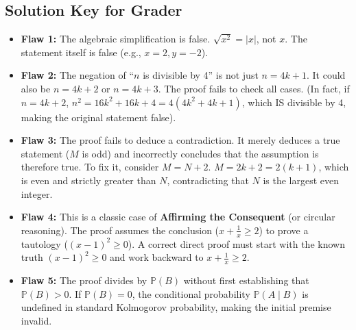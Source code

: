 \documentclass[11pt, a4paper]{article}
\theoremstyle{definition}
\theoremstyle{remark}
\newcommand{\Prob}{\mathbb{P}}
\begin{document}
\subsection*{Solution Key for Grader}
\begin{itemize}
    \item \textbf{Flaw 1:} The algebraic simplification is false. $\sqrt{x^2} = |x|$, not $x$. The statement itself is false (e.g., $x=2, y=-2$).
    \item \textbf{Flaw 2:} The negation of ``$n$ is divisible by 4'' is not just $n = 4k+1$. It could also be $n = 4k+2$ or $n = 4k+3$. The proof fails to check all cases. (In fact, if $n=4k+2$, $n^2 = 16k^2 + 16k + 4 = 4(4k^2+4k+1)$, which IS divisible by 4, making the original statement false).
    \item \textbf{Flaw 3:} The proof fails to deduce a contradiction. It merely deduces a true statement ($M$ is odd) and incorrectly concludes that the assumption is therefore true. To fix it, consider $M = N + 2$. $M = 2k + 2 = 2(k+1)$, which is even and strictly greater than $N$, contradicting that $N$ is the largest even integer.
    \item \textbf{Flaw 4:} This is a classic case of \textbf{Affirming the Consequent} (or circular reasoning). The proof assumes the conclusion ($x + \frac{1}{x} \geq 2$) to prove a tautology ($(x-1)^2 \geq 0$). A correct direct proof must start with the known truth $(x-1)^2 \geq 0$ and work backward to $x + \frac{1}{x} \geq 2$.
    \item \textbf{Flaw 5:} The proof divides by $\Prob(B)$ without first establishing that $\Prob(B) > 0$. If $\Prob(B) = 0$, the conditional probability $\Prob(A \mid B)$ is undefined in standard Kolmogorov probability, making the initial premise invalid.
\end{itemize}
\end{document}

